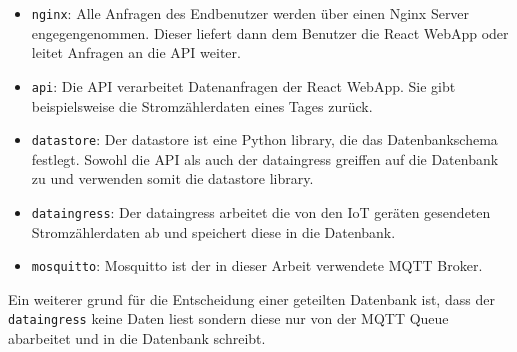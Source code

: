 \begin{itemize}
    \item \texttt{nginx}:
        Alle Anfragen des Endbenutzer werden über einen Nginx Server
        engegengenommen. Dieser liefert dann dem Benutzer die React WebApp
        oder leitet Anfragen an die \ac{API} weiter.

    \item \texttt{api}:
        Die \ac{API} verarbeitet Datenanfragen der React WebApp. Sie gibt
        beispielsweise die Stromzählerdaten eines Tages zurück.

    \item \texttt{datastore}:
        Der datastore ist eine Python library, die das Datenbankschema festlegt.
        Sowohl die \ac{API} als auch der dataingress greiffen auf die Datenbank zu
        und verwenden somit die datastore library.

    \item \texttt{dataingress}:
        Der dataingress arbeitet die von den \ac{IoT} geräten gesendeten
        Stromzählerdaten ab und speichert diese in die Datenbank.

    \item \texttt{mosquitto}:
        Mosquitto ist der in dieser Arbeit verwendete \ac{MQTT} Broker.
\end{itemize}

Ein weiterer grund für die Entscheidung einer geteilten Datenbank ist,
dass der \texttt{dataingress} keine Daten liest sondern diese nur von
der \ac{MQTT} Queue abarbeitet und in die Datenbank schreibt.